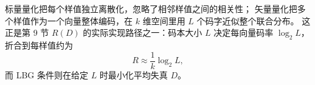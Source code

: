 
\begin{strand}
标量量化把每个样值独立离散化，忽略了相邻样值之间的相关性；
矢量量化把多个样值作为一个向量整体编码，在 $k$ 维空间里用 $L$ 个码字近似整个联合分布。
这正是第 9 节 $R(D)$ 的实际实现路径之一：码本大小 $L$ 决定每向量码率 $\log_2 L$，
折合到每样值约为
\[
R\approx\dfrac{1}{k}\log_2 L,
\]
而 LBG 条件则在给定 $L$ 时最小化平均失真 $D$。
\end{strand}

